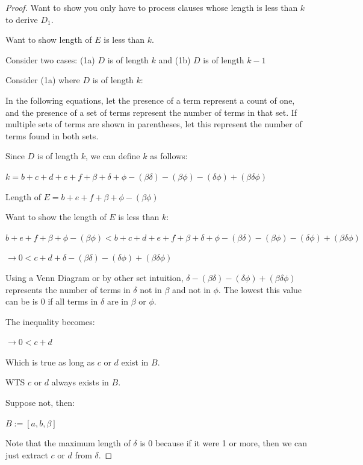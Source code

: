 \documentclass[manuscript]{acmart}
\begin{document}
\begin{proof}

        Want to show you only have to process clauses whose length is
        less than $k$ to derive $D_1$.

        Want to show length of $E$ is less than $k$.

        Consider two cases: (1a) $D$ is of length $k$ and 
        (1b) $D$ is of length $k - 1$
        
        Consider (1a) where $D$ is of length $k$:

        In the following equations, let the presence of a term represent a count of one,
        and the presence of a set of terms represent the number of terms in that set. If
        multiple sets of terms are shown in parentheses, let this represent the number
        of terms found in both sets.

        Since $D$ is of length $k$, we can define $k$ as follows:

        $k = b + c + d + e + f + \beta + \delta + \phi - (\beta \delta) 
        - (\beta \phi) - (\delta \phi) + (\beta \delta \phi)$

        Length of $E = b + e + f + \beta + \phi - (\beta \phi)$
        
        Want to show the length of $E$ is less than $k$:

        $b + e + f + \beta + \phi - (\beta \phi) < b + c + d + e + f + 
        \beta + \delta + \phi - (\beta \delta) - (\beta \phi) - (\delta \phi) 
        + (\beta \delta \phi)$

        $\rightarrow 0 < c + d + \delta - (\beta \delta) 
        - (\delta \phi) + (\beta \delta \phi)$

        Using a Venn Diagram or by other set intuition, $\delta - 
        (\beta \delta) - (\delta \phi) + (\beta \delta \phi)$ represents
        the number of terms in $\delta$ not in $\beta$ and not in $\phi$. 
        The lowest this value can be is 0 if all terms in $\delta$ are in 
        $\beta$ or $\phi$.

        The inequality becomes:

        $\rightarrow 0 < c + d$

        Which is true as long as $c$ or $d$ exist in $B$.

        WTS $c$ or $d$ always exists in $B$.

        Suppose not, then:

        $B := [a, b, \beta]$

        Note that the maximum length of $\delta$ is 0 because if it were 1
        or more, then we can just extract $c$ or $d$ from $\delta$.


\end{proof}
\end{document}
